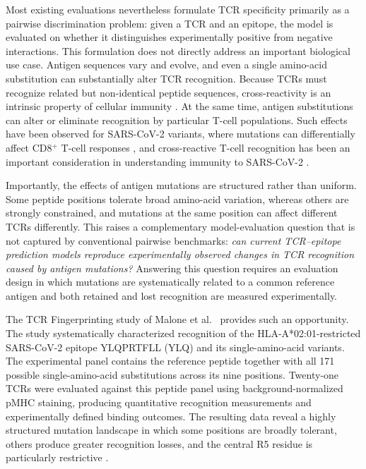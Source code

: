 \documentclass{article}
\begin{document}
Most existing evaluations nevertheless formulate TCR specificity primarily
as a pairwise discrimination problem: given a TCR and an epitope, the model
is evaluated on whether it distinguishes experimentally positive from
negative interactions. This formulation does not directly address an
important biological use case. Antigen sequences vary and evolve, and even
a single amino-acid substitution can substantially alter TCR recognition.
Because TCRs must recognize related but non-identical peptide sequences,
cross-reactivity is an intrinsic property of cellular immunity
\cite{sewell12}. At the same time, antigen substitutions can alter or
eliminate recognition by particular T-cell populations. Such effects have
been observed for SARS-CoV-2 variants, where mutations can differentially
affect CD8$^+$ T-cell responses
\cite{buckley2023systems}, and cross-reactive T-cell recognition has been an
important consideration in understanding immunity to SARS-CoV-2
\cite{yang2023sars}.

Importantly, the effects of antigen mutations are structured rather than
uniform. Some peptide positions tolerate broad amino-acid variation, whereas
others are strongly constrained, and mutations at the same position can
affect different TCRs differently. This raises a complementary
model-evaluation question that is not captured by conventional pairwise
benchmarks:
\emph{can current TCR--epitope prediction models reproduce experimentally
observed changes in TCR recognition caused by antigen mutations?}
Answering this question requires an evaluation design in which mutations are
systematically related to a common reference antigen and both retained and
lost recognition are measured experimentally.

The TCR Fingerprinting study of Malone et
al.~\cite{malone2025fingerprinting} provides such an opportunity. The study
systematically characterized recognition of the HLA-A*02:01-restricted
SARS-CoV-2 epitope YLQPRTFLL (YLQ) and its single-amino-acid variants. The
experimental panel contains the reference peptide together with all 171
possible single-amino-acid substitutions across its nine positions.
Twenty-one TCRs were evaluated against this peptide panel using
background-normalized pMHC staining, producing quantitative recognition
measurements and experimentally defined binding outcomes. The resulting data
reveal a highly structured mutation landscape in which some positions are
broadly tolerant, others produce greater recognition losses, and the central
R5 residue is particularly restrictive
\cite{malone2025fingerprinting}.
\end{document}
